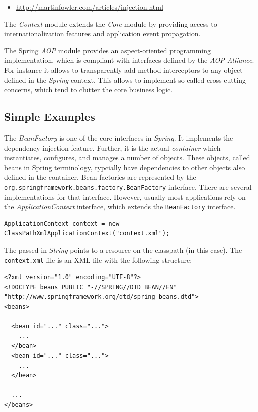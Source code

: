 \begin{itemize}
 \item \href{http://martinfowler.com/articles/injection.html}{http://martinfowler.com/articles/injection.html}
\end{itemize}

The \emph{Context} module extends the \emph{Core} module by providing access
to internationalization features and application event propagation.

The Spring \emph{AOP} module provides an aspect-oriented programming 
implementation, which is compliant with interfaces defined by the 
\emph{AOP Alliance}. For instance it allows to transparently add method
interceptors to any object defined in the \emph{Spring} context. This allows
to implement so-called cross-cutting concerns, which tend to clutter the
core business logic.


\subsection{Simple Examples}

The \emph{BeanFactory} is one of the core interfaces in \emph{Spring}. It
implements the dependency injection feature. Further, it is the actual
\emph{container} which instantiates, configures, and manages a number of
objects. These objects, called beans in Spring terminology, typcially have
dependencies to other objects also defined in the container. Bean factories
are represented by the \texttt{org.springframework.beans.factory.BeanFactory}
interface. There are several implementations for that interface. However,
usually most applications rely on the \emph{ApplicationContext} interface, which
extends the \texttt{BeanFactory} interface.

\begin{verbatim}
ApplicationContext context = new ClassPathXmlApplicationContext("context.xml");
\end{verbatim}

The passed in \emph{String} points to a resource on the classpath (in this 
case). The \texttt{context.xml} file is an XML file with the following
structure:

\small{\begin{verbatim}
<?xml version="1.0" encoding="UTF-8"?>
<!DOCTYPE beans PUBLIC "-//SPRING//DTD BEAN//EN" "http://www.springframework.org/dtd/spring-beans.dtd">
<beans>
  
  <bean id="..." class="...">
    ...
  </bean>
  <bean id="..." class="...">
    ...
  </bean>

  ...
</beans>
\end{verbatim}}

